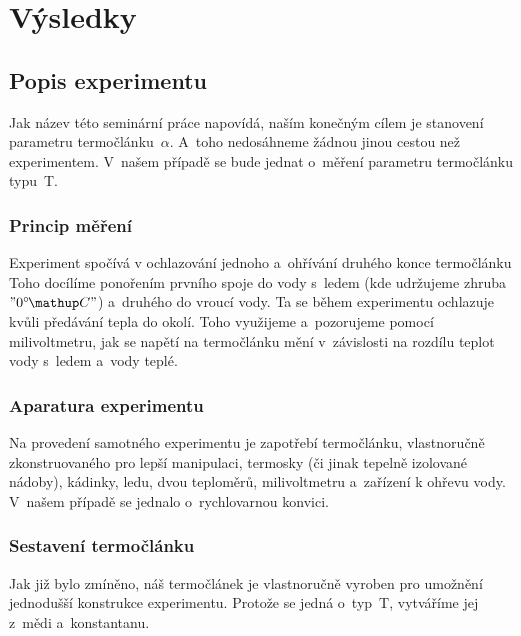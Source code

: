
\section{Výsledky}
\subsection{Popis experimentu}
Jak název této seminární práce napovídá, naším konečným cílem je stanovení
parametru termočlánku~$\alpha$. A~toho nedosáhneme žádnou jinou cestou než
experimentem. V~našem případě se bude jednat o~měření parametru termočlánku
typu~T.

\subsubsection{Princip měření}
Experiment spočívá v ochlazování jednoho a~ohřívání druhého konce termočlánku%
 Toho docílíme ponořením prvního
spoje do vody s~ledem (kde udržujeme zhruba~$"0 \C"$) a~druhého do vroucí vody.
Ta se během experimentu ochlazuje kvůli předávání tepla do okolí. Toho
využijeme a~pozorujeme pomocí milivoltmetru, jak se napětí na termočlánku
mění v~závislosti na rozdílu teplot vody s~ledem a~vody teplé.

\subsubsection{Aparatura experimentu}
Na provedení samotného experimentu je zapotřebí termočlánku, vlastnoručně
zkonstruovaného pro lepší manipulaci, termosky (či jinak tepelně izolované
nádoby), kádinky, ledu, dvou teploměrů, milivoltmetru a~zařízení k ohřevu vody.
V~našem případě se jednalo o~rychlovarnou konvici.

\subsubsection{Sestavení termočlánku}
Jak již bylo zmíněno, náš termočlánek je vlastnoručně vyroben pro umožnění
jednodušší konstrukce experimentu. Protože se jedná o~typ~T, vytváříme jej
z~mědi a~konstantanu. 

